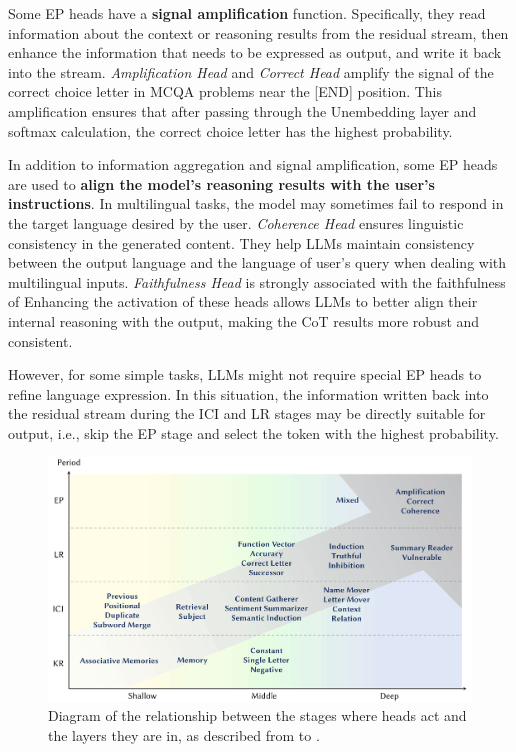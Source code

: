 \documentclass[12pt,letterpaper]{article}
\begin{document}
Some EP heads have a \textbf{signal amplification} function. Specifically, they read information about the context or reasoning results from the residual stream, then enhance the information that needs to be expressed as output, and write it back into the stream.
\textit{Amplification Head} \citep{CorrectLetterHead_23_arXiv_DeepMind} and \textit{Correct Head} \citep{CorrectHead_24_arXiv_Allen} amplify the signal of the correct choice letter in MCQA problems near the [END] position. This amplification ensures that after passing through the Unembedding layer and softmax calculation, the correct choice letter has the highest probability.

In addition to information aggregation and signal amplification, some EP heads are used to \textbf{align the model's reasoning results with the user's instructions}.
In multilingual tasks, the model may sometimes fail to respond in the target language desired by the user. \textit{Coherence Head} ensures linguistic consistency in the generated content.\citep{CrossLingual_24_SIGIR_UCAS} They help LLMs maintain consistency between the output language and the language of user's query when dealing with multilingual inputs.
\textit{Faithfulness Head} is strongly associated with the faithfulness of  Enhancing the activation of these heads allows LLMs to better align their internal reasoning with the output, making the CoT results more robust and consistent.

However, for some simple tasks, LLMs might not require special EP heads to refine language expression. In this situation, the information written back into the residual stream during the ICI and LR stages may be directly suitable for output, i.e., skip the EP stage and select the token with the highest probability. 

\begin{figure}[htbp]
    \centering
    \includegraphics[width=0.75\linewidth]{figures/4periods3layers.pdf}
    \caption{Diagram of the relationship between the stages where heads act and the layers they are in, as described from  to .}
    \label{fig:4stage3layer}
\end{figure}
\end{document}
